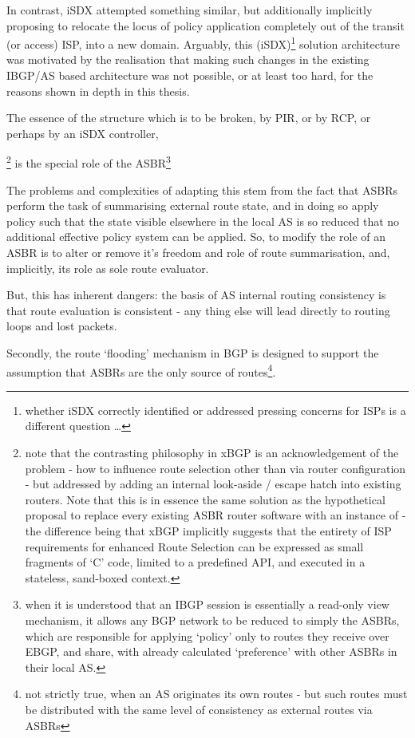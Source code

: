  In contrast, iSDX attempted something similar, but additionally  implicitly proposing to relocate the locus of policy application completely out of the transit (or access) ISP, into a new domain.  Arguably, this (iSDX)\footnote{whether iSDX correctly identified or addressed pressing concerns for ISPs is a different question \ldots} solution architecture was motivated by the realisation that making such changes in the existing IBGP/AS based architecture was not possible, or at least too hard, for the reasons shown in depth in this thesis. 

 The essence of the structure which is to be broken, by PIR, or by RCP, or perhaps by an iSDX controller,
 
 \footnote{note that the contrasting philosophy in xBGP\cite{Wirtgen2020}
 is an acknowledgement of the problem - how to influence route selection other than via router configuration - but addressed by adding an internal look-aside / escape hatch into existing routers.
 Note that this is in essence the same solution as the hypothetical proposal to replace every existing ASBR router software with an instance of \hbgp - the difference being that xBGP implicitly suggests that the entirety of ISP requirements for enhanced Route Selection can be expressed as small fragments of `C' code, limited to a predefined API, and executed in a stateless, sand-boxed context.
}
is the special role of the ASBR\footnote{when it is understood that an IBGP session is essentially a read-only view mechanism, it allows any BGP network to be reduced to simply the ASBRs, which are responsible for applying `policy' only to routes they receive over EBGP, and share, with already calculated `preference' with other ASBRs in their local AS.}

The problems and complexities of adapting this stem from the fact that ASBRs perform the task of summarising external route state, and in doing so apply policy such that the state visible elsewhere in the local AS is so reduced that no additional effective policy system can be applied.  So, to modify the role of an ASBR is to alter or remove it's freedom and role of route summarisation, and, implicitly, its role as sole route evaluator.

But, this has inherent dangers: the basis of AS internal routing consistency is that route evaluation is consistent - any thing else will lead directly to routing loops and lost packets.

Secondly, the route `flooding' mechanism in BGP is designed to support the assumption that ASBRs are the only source of routes\footnote{not strictly true, when an AS originates its own routes - but such routes must be distributed with the same level of consistency as external routes via ASBRs}.

